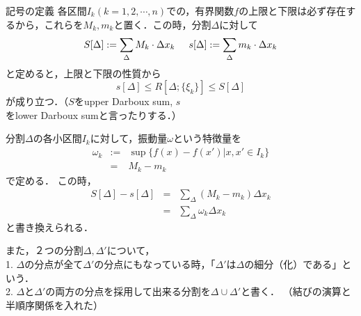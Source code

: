\documentclass[uplatex, dvipdfmx]{jsreport}
\begin{document}
\begin{itembox}[l]{記号の定義}
    各区間$I_k(k=1,2,\cdots,n)$での，有界関数$f$の上限と下限は必ず存在するから，これらを$M_k,m_k$と置く．この時，分割$\Delta$に対して
    \[ S[\Delta ] := \sum_\Delta M_k \cdot \Delta x_k \hspace{5mm} s[\Delta ] := \sum_\Delta m_k \cdot \Delta x_k \]
    と定めると，上限と下限の性質から
    \[ s[\Delta] \le R[\Delta;\{\xi_k\}] \le S[\Delta] \]
    が成り立つ．（$S$をupper Darboux sum, $s$をlower Darboux sumと言ったりする．）

    分割$\Delta$の各小区間$I_k$に対して，振動量$\omega$という特徴量を
    \begin{eqnarray*}\omega_k &:=& \sup \{ f(x)-f(x') | x,x' \in I_k \}\\ &=& M_k - m_k\end{eqnarray*}
    で定める．
    この時，\begin{eqnarray*}
        S[\Delta]-s[\Delta] &=& \sum_\Delta (M_k-m_k)\Delta x_k \\
        &=& \sum_\Delta \omega_k \Delta x_k
    \end{eqnarray*}と書き換えられる．

    また，２つの分割$\Delta, \Delta'$について，\\
    1. $\Delta$の分点が全て$\Delta'$の分点にもなっている時，「$\Delta'$は$\Delta$の細分（化）である」という．\\
    2. $\Delta$と$\Delta'$の両方の分点を採用して出来る分割を$\Delta\cup\Delta'$と書く．
    （結びの演算と半順序関係を入れた）
\end{itembox}
\end{document}

